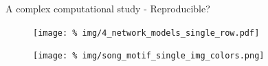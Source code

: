 
\begin{frame}{A complex computational study - Reproducible?}

  \begin{figure}
    \centering
    \texttt{[image: \%
    img/4\_network\_models\_single\_row.pdf]} %
  \end{figure}

  \vspace{-0.3cm}
  
  \begin{figure}
    \centering
    \texttt{[image: \%
    img/song\_motif\_single\_img\_colors.png]} %
  \end{figure}

 
  
\end{frame}
